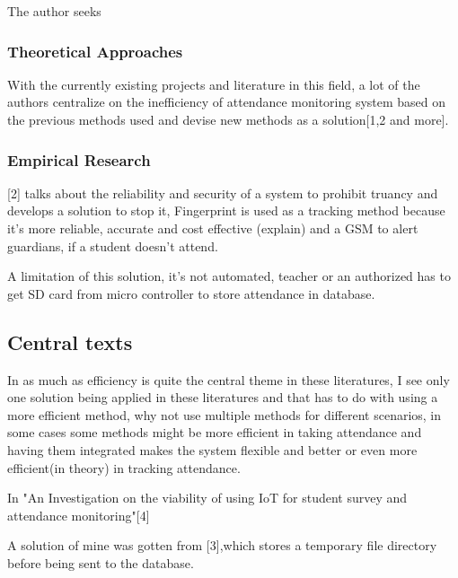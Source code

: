 The author seeks


\subsubsection{Theoretical Approaches}
With the currently existing projects and literature in this field, a lot of the authors centralize on the inefficiency of attendance monitoring system based on the previous methods used and devise new methods as a solution[1,2 and more]. 

\subsubsection{Empirical Research}
[2] talks about the reliability and security of a system to prohibit truancy and develops a solution to stop it, Fingerprint is used as a tracking method because it's more reliable, accurate and cost effective (explain) and a GSM to alert guardians, if a student doesn't attend.

A limitation of this solution, it's not automated, teacher or an authorized has to get SD card from micro controller to store attendance in database.


\subsection{Central texts}

In as much as efficiency is quite the central theme in these literatures, I see only one solution being applied in these literatures and that has to do with using a more efficient method, why not use multiple methods for different scenarios, in some cases some methods might be more efficient in taking attendance and having them integrated makes the system flexible and better or even more efficient(in theory) in tracking attendance.

In "An Investigation on the viability of using IoT for student survey and attendance monitoring"[4]



A solution of mine was gotten from [3],which stores a temporary file directory before being sent to the database.

